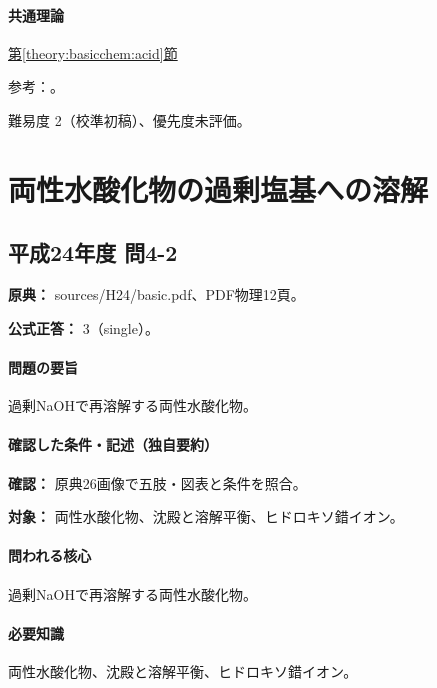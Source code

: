 \paragraph{共通理論} \hyperref[theory:basicchem:acid]{第\ref*{theory:basicchem:acid}節}

\par 参考：\cite{purdue_acid_strength,yale_hydrohalic}。

\par 難易度 2（校準初稿）、優先度未評価。

\section{両性水酸化物の過剰塩基への溶解}

\subsection{平成24年度 問4-2}
\label{q:h24-reg-basic-4-2}

\noindent\textbf{原典：} sources/H24/basic.pdf、PDF物理12頁。

\textbf{公式正答：} 3（single）。

\paragraph{問題の要旨} 過剰NaOHで再溶解する両性水酸化物。

\paragraph{確認した条件・記述（独自要約）}\mbox{}\par

\noindent\textbf{確認：} 原典26画像で五肢・図表と条件を照合。\par

\noindent\textbf{対象：} 両性水酸化物、沈殿と溶解平衡、ヒドロキソ錯イオン。\par

\paragraph{問われる核心} 過剰NaOHで再溶解する両性水酸化物。

\paragraph{必要知識} 両性水酸化物、沈殿と溶解平衡、ヒドロキソ錯イオン。

